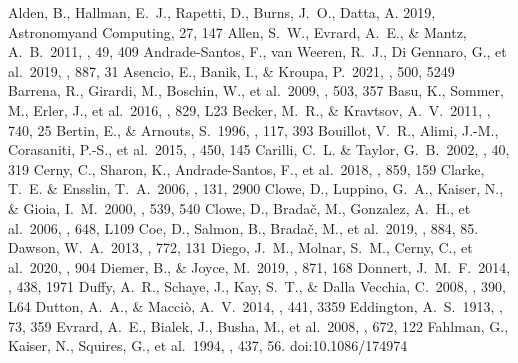 \documentclass[twocolumn]{aastex631}
\begin{document}
\begin{thebibliography}{}
 Alden, B., Hallman, E.~J., Rapetti, D., Burns, J.~O., Datta, A. 2019, Astronomyand Computing, 27, 147
 Allen, S.~W., Evrard, A.~E., \& Mantz, A.~B.\ 2011, \araa, 49, 409
 Andrade-Santos, F., van Weeren, R.~J., Di Gennaro, G., et al.\ 2019, \apj, 887, 31
 Asencio, E., Banik, I., \& Kroupa, P.\ 2021, \mnras, 500, 5249
 Barrena, R., Girardi, M., Boschin, W., et al.\ 2009, \aap, 503, 357
 Basu, K., Sommer, M., Erler, J., et al.\ 2016, \apjl, 829, L23
 Becker, M.~R., \& Kravtsov, A.~V.\ 2011, \apj, 740, 25
 Bertin, E., \& Arnouts, S.\ 1996, \aaps, 117, 393
 Bouillot, V.~R., Alimi, J.-M., Corasaniti, P.-S., et al.\ 2015, \mnras, 450, 145
 Carilli, C.~L. \& Taylor, G.~B.\ 2002, \araa, 40, 319
 Cerny, C., Sharon, K., Andrade-Santos, F., et al.\ 2018, \apj, 859, 159
 Clarke, T.~E. \& Ensslin, T.~A.\ 2006, \aj, 131, 2900
 Clowe, D., Luppino, G.~A., Kaiser, N., \& Gioia, I.~M.\ 2000, \apj, 539, 540 
 Clowe, D., Brada{\v{c}}, M., Gonzalez, A.~H., et al.\ 2006, \apjl, 648, L109
 Coe, D., Salmon, B., Brada{\v{c}}, M., et al.\ 2019, \apj, 884, 85.
 Dawson, W.~A.\ 2013, \apj, 772, 131
 Diego, J.~M., Molnar, S.~M., Cerny, C., et al.\ 2020, \apj, 904
 Diemer, B., \& Joyce, M.\ 2019, \apj, 871, 168
 Donnert, J.~M.~F.\ 2014, \mnras, 438, 1971
 Duffy, A.~R., Schaye, J., Kay, S.~T., \& Dalla Vecchia, C.\ 2008, \mnras, 390, L64 
 Dutton, A.~A., \& Macci{\`o}, A.~V.\ 2014, \mnras, 441, 3359 
 Eddington, A.~S.\ 1913, \mnras, 73, 359
 Evrard, A.~E., Bialek, J., Busha, M., et al.\ 2008, \apj, 672, 122
 Fahlman, G., Kaiser, N., Squires, G., et al.\ 1994, \apj, 437, 56. doi:10.1086/174974

\end{thebibliography}
\end{document}
